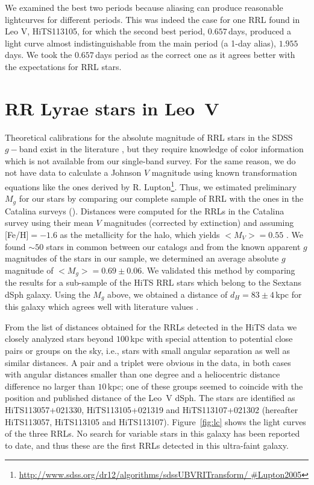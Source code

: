 \documentclass[iop]{emulateapj}
\begin{document}
We examined the best two periods because aliasing can produce reasonable lightcurves for different periods. 
This was indeed the case for one RRL found in Leo V, HiTS113105, for which the second best period, $0.657$\,days, produced a light curve almost indistinguishable from the main period (a 1-day alias), $1.955$\,days.
We took the $0.657$\,days period as the correct one as it agrees better with the expectations for RRL stars.

\section{RR Lyrae stars in Leo~V}

Theoretical calibrations for the absolute magnitude of RRL stars in the SDSS $g-$band exist in the literature \citep{marconi06,caceres08}, but they require knowledge of color information which is not available from our single-band survey.
For the same reason, we do not have data to calculate a Johnson $V$ magnitude using known transformation equations like the ones derived by R. Lupton\footnote{\footnotesize  \url{http://www.sdss.org/dr12/algorithms/sdssUBVRITransform/ \#Lupton2005}}.
Thus, we estimated preliminary $M_g$ for our stars by comparing our complete sample of RRL with the ones in the Catalina surveys (\citealt{Dra13, Dra14}). 
Distances were computed for the RRLs in the Catalina survey using their mean $V$ magnitudes (corrected by extinction) and assuming [Fe/H]$=-1.6$ as the metallicity for the halo, which yields $<M_V>=0.55$ \citep{Dem00}. 
We found $\sim50$ stars in common between our catalogs and from the known apparent $g$ magnitudes of the stars in our sample, we determined an average absolute $g$ magnitude of $<M_g>=0.69\pm 0.06$. 
We validated this method by comparing the results for a sub-sample of the HiTS RRL stars which belong to the Sextans dSph galaxy. 
Using the $M_g$ above, we obtained a distance of $d_{H}=83\pm 4$\,kpc for this galaxy which agrees well with literature values \citep[e.g.,][]{Lee09}.

From the list of distances obtained for the RRLs detected in the HiTS data we closely analyzed stars beyond $100$\,kpc with special attention to potential close pairs or groups on the sky, i.e., stars with small angular separation as well as similar distances. 
A pair and a triplet were obvious in the data, in both cases with angular distances smaller than one degree and a heliocentric distance difference no larger than $10$\,kpc; one of these groups seemed to coincide with the position and published distance of the Leo~V dSph. 
The stars are identified as HiTS113057+021330, HiTS113105+021319 and HiTS113107+021302 (hereafter HiTS113057, HiTS113105 and HiTS113107).
Figure~\ref{fig:lc} shows the light curves of the three RRLs. No search for variable stars in this galaxy has been reported to date, and thus these are the first RRLs detected in this ultra-faint galaxy.
\end{document}
